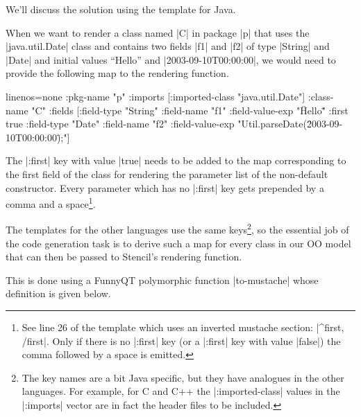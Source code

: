 \documentclass[a4paper]{article}
\newcommand{\code}{\clojureinline}
\begin{document}
We'll discuss the solution using the template for Java.


When we want to render a class named \code|C| in package \code|p| that uses the
\code|java.util.Date| class and contains two fields \code|f1| and \code|f2| of
type \code|String| and \code|Date| and initial values ``Hello'' and
\code|2003-09-10T00:00:00|, we would need to provide the following map to the
rendering function.

\begin{clojurecode*}{linenos=none}
  {:pkg-name "p"
   :imports [{:imported-class "java.util.Date"}]
   :class-name "C"
   :fields [{:field-type "String"
             :field-name "f1"
             :field-value-exp "\"Hello\""
             :first true}
            {:field-type "Date"
             :field-name "f2"
             :field-value-exp "Util.parseDate(\"2003-09-10T00:00:00\");"}]}
\end{clojurecode*}

The \code|:first| key with value \code|true| needs to be added to the map
corresponding to the first field of the class for rendering the parameter list
of the non-default constructor.  Every parameter which has no \code|:first| key
gets prepended by a comma and a space\footnote{See line 26 of the template
  which uses an inverted mustache section: \javainline|{{^first}}, {{/first}}|.
  Only if there is no \code|:first| key (or a \code|:first| key with value
  \code|false|) the comma followed by a space is emitted.}.

The templates for the other languages use the same keys\footnote{The key names
  are a bit Java specific, but they have analogues in the other languages.  For
  example, for C and C++ the \code|:imported-class| values in the
  \code|:imports| vector are in fact the header files to be included.}, so the
essential job of the code generation task is to derive such a map for every
class in our OO model that can then be passed to Stencil's rendering function.

This is done using a FunnyQT polymorphic function \code|to-mustache| whose
definition is given below.

\end{document}
